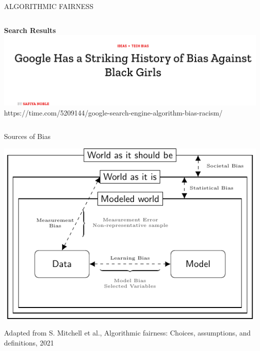 \documentclass[11pt,compress,t,notes=noshow, xcolor=table]{beamer}
\begin{document}
\begin{vbframe}{ALGORITHMIC FAIRNESS}
\begin{columns}
\begin{column}{0.5\textwidth}
\begin{center}
                \textbf{Search Results}
                \includegraphics[height=0.2\textheight]{figures/black_girls.png}
                \tiny{https://time.com/5209144/google-search-engine-algorithm-bias-racism/}
            \end{center}
        \end{column}
    \end{columns}
\end{vbframe}




\begin{vbframe}{Sources of Bias}
    \begin{center}
        \includegraphics[scale=1]{figures/bias_overview.pdf}
    \end{center}
    \tiny{Adapted from S. Mitchell et al., Algorithmic fairness: Choices, assumptions, and definitions, 2021}
\end{vbframe}
\end{document}
